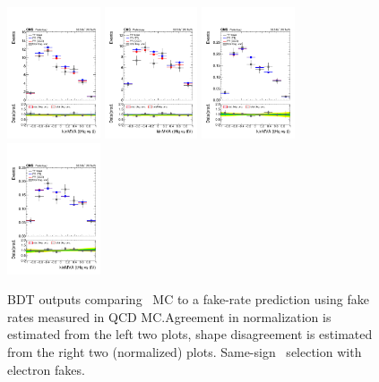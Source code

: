 \begin{figure}[htb]
 \centering
 \includegraphics[width=0.245\textwidth]{figures/FR_closures/thqMVA_tt_2lss_em_elfake_norm.pdf} 
 \includegraphics[width=0.245\textwidth]{figures/FR_closures/thqMVA_ttv_2lss_em_elfake_norm.pdf} 
 \includegraphics[width=0.245\textwidth]{figures/FR_closures/thqMVA_tt_2lss_em_elfake_shape.pdf} 
 \includegraphics[width=0.245\textwidth]{figures/FR_closures/thqMVA_ttv_2lss_em_elfake_shape.pdf}\\ 
\caption{BDT outputs comparing \ttbar\ MC to a fake-rate prediction using fake rates measured in QCD MC.\@ Agreement in normalization is estimated from the left two plots, shape disagreement is estimated from the right two (normalized) plots. Same-sign \emu\ selection with electron fakes.} 
\label{fig:frclosure_2lss_em_elfake}
\end{figure} 

